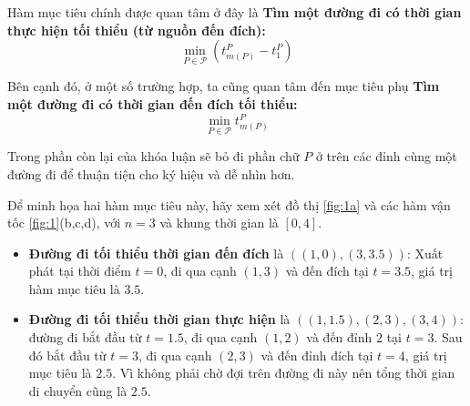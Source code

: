 \documentclass[../main.tex]{subfiles}
\begin{document}
Hàm mục tiêu chính được quan tâm ở đây là \textbf{Tìm một đường đi có thời gian thực hiện tối thiểu (từ nguồn đến đích):}
  \[\min_{P\in \mathcal P}(t_{m(P)}^P-t_1^P)\]



Bên cạnh đó, ở một số trường hợp, ta cũng quan tâm đến mục tiêu phụ \textbf{Tìm một đường đi có thời gian đến đích tối thiểu:}
    \[\min_{P\in \mathcal P}t_{m(P)}^P\]

  
Trong phần còn lại của khóa luận sẽ bỏ đi phần chữ \(P\) ở trên các đỉnh cùng một đường đi để thuận tiện cho ký hiệu và dễ nhìn
hơn.

Để minh họa hai hàm mục tiêu này, hãy xem xét đồ thị \autoref{fig:1a} và các hàm vận tốc 
\autoref{fig:1}(b,c,d), với \(n = 3\) và khung thời gian
là \([0, 4]\).

\begin{itemize}
\tightlist
\item
  \textbf{Đường đi tối thiểu thời gian đến đích} là
  \(((1, 0), (3, 3.5))\): Xuất phát tại thời điểm \(t = 0\), đi qua cạnh
  \((1, 3)\) và đến đích tại \(t = 3.5\), giá trị hàm mục tiêu là
  \(3.5\).
\item
  \textbf{Đường đi tối thiểu thời gian thực hiện} là
  \(((1, 1.5), (2, 3), (3, 4))\): đường đi bắt đầu từ \(t = 1.5\), đi
  qua cạnh \((1, 2)\) và đến đỉnh \(2\) tại \(t = 3\). Sau đó bắt đầu từ
  \(t = 3\), đi qua cạnh \((2, 3)\) và đến đỉnh đích tại \(t = 4\), giá
  trị mục tiêu là \(2.5\). Vì không phải chờ đợi trên đường đi này nên
  tổng thời gian di chuyển cũng là \(2.5\).
\end{itemize}
\end{document}
